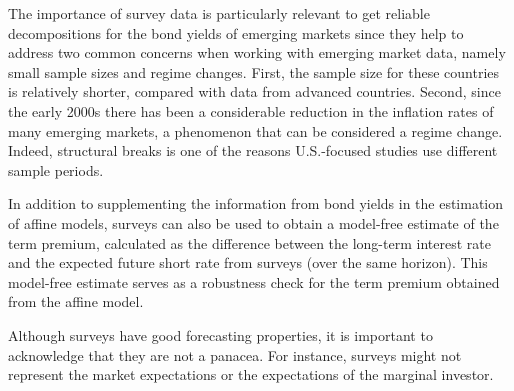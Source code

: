 {%

The importance of survey data is particularly relevant to get reliable decompositions for the bond yields of emerging markets since they help to address two common concerns when working with emerging market data, namely small sample sizes and regime changes.
First, the sample size for these countries is relatively shorter, compared with data from advanced countries.
Second, since the early 2000s there has been a considerable reduction in the inflation rates of many emerging markets, a phenomenon that can be considered a regime change. 
Indeed, structural breaks is one of the reasons U.S.-focused studies use different sample periods.

In addition to supplementing the information from bond yields in the estimation of affine models, surveys can also be used to obtain a model-free estimate of the term premium, calculated as the difference between the long-term interest rate and the expected future short rate from surveys (over the same horizon). This model-free estimate serves as a robustness check for the term premium obtained from the affine model.

Although surveys have good forecasting properties, it is important to acknowledge that they are not a panacea. For instance, surveys might not represent the market expectations or the expectations of the marginal investor.

}

